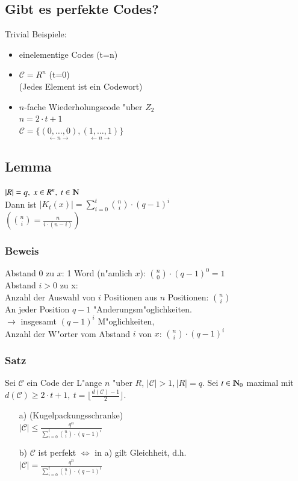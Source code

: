 \subsection{Gibt es perfekte Codes?}
Trivial Beispiele:
\begin{itemize}
	\item einelementige Codes (t=n)
	\item $\mathcal{C} = R^n$ (t=0) \\
				(Jedes Element ist ein Codewort)
	\item $n$-fache Wiederholungscode "uber $Z_2$ \\
				$n=2 \cdot t +1$ \\
				$\mathcal{C} = \lbrace \underset{\longleftarrow n \longrightarrow}{(0,\ldots,0)},\underset{\longleftarrow n \longrightarrow}{(1,\ldots,1)}\rbrace$
\end{itemize}

\subsection{Lemma}
$\left| R \right| = q,\ x \in R^n,\ t \in \N$ \\
Dann ist $\left| K_t(x) \right| = \sum_{i=0}^t \binom{n}{i} \cdot (q-1)^i$ \\
$\left(\binom{n}{i}=\frac{n\!}{i\! \cdot (n-i)\!}\right)$

\subsubsection{Beweis}
Abstand 0 zu $x$: 1 Word (n"amlich $x$): $\binom{n}{0} \cdot (q-1)^0 =1$ \\
Abstand $i>0$ zu x: \\
Anzahl der Auswahl von $i$ Positionen aus $n$ Positionen: $\binom{n}{i}$ \\
An jeder Position $q-1$ "Anderungsm"oglichkeiten. \\
$\rightarrow$ insgesamt $(q-1)^i$ M"oglichkeiten, \\
Anzahl der W"orter vom Abstand $i$ von $x$: $\binom{n}{i} \cdot (q-1)^i$

\subsubsection{Satz}
Sei $\mathcal{C}$ ein Code der L"ange $n$ "uber $R$, $\left| \mathcal{C} \right|> 1, \left|R\right| = q$. Sei $t \in \N_0$ maximal mit $d(\mathcal{C}) \geq 2 \cdot t + 1,\ t=\lfloor \frac{d(\mathcal{C})-1}{2}\rfloor$.
\begin{itemize}
	\item[a)] (Kugelpackungsschranke) \\
	$\left|\mathcal{C}\right| \leq \frac{q^n}{\sum_{i=0}^t \binom{n}{i} \cdot (q-1)^i}$
	\item[b)] $\mathcal{C}$ ist perfekt $\Leftrightarrow$ in a) gilt Gleichheit, d.h. \\
	$\left|\mathcal{C}\right| = \frac{q^n}{\sum_{i=0}^t \binom{n}{i} \cdot (q-1)^i}$
\end{itemize}

